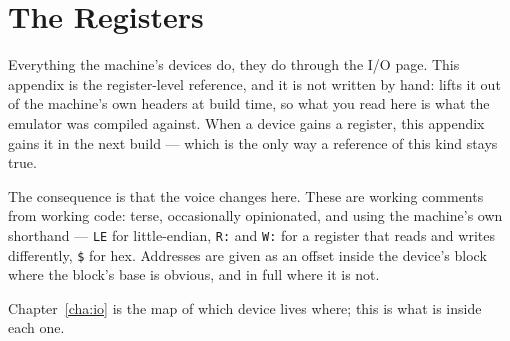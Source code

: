 \chapter{The Registers}\label{cha:registers}

Everything the machine's devices do, they do through the I/O page. This
appendix is the register-level reference, and it is not written by hand:
 lifts it out of the machine's own headers at
build time, so what you read here is what the emulator was compiled
against. When a device gains a register, this appendix gains it in the
next build --- which is the only way a reference of this kind stays true.

The consequence is that the voice changes here. These are working
comments from working code: terse, occasionally opinionated, and using
the machine's own shorthand --- \verb|LE| for little-endian, \verb|R:|
and \verb|W:| for a register that reads and writes differently, \verb|$|
for hex. Addresses are given as an offset inside the device's block
where the block's base is obvious, and in full where it is not.

Chapter~\ref{cha:io} is the map of which device lives where; this is what
is inside each one.


